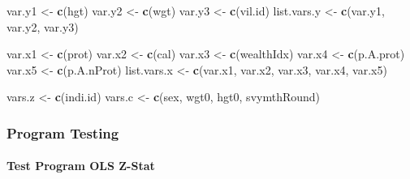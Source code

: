 \documentclass[
]{book}
\newenvironment{Shaded}{\begin{snugshade}}{\end{snugshade}}
\newcommand{\KeywordTok}[1]{\textcolor[rgb]{0.13,0.29,0.53}{\textbf{#1}}}
\newcommand{\NormalTok}[1]{#1}
\newcommand{\StringTok}[1]{\textcolor[rgb]{0.31,0.60,0.02}{#1}}
\begin{document}
\begin{Shaded}
\begin{Highlighting}[]
\NormalTok{var.y1 \textless{}{-}}\StringTok{ }\KeywordTok{c}\NormalTok{(}\StringTok{\textquotesingle{}hgt\textquotesingle{}}\NormalTok{)}
\NormalTok{var.y2 \textless{}{-}}\StringTok{ }\KeywordTok{c}\NormalTok{(}\StringTok{\textquotesingle{}wgt\textquotesingle{}}\NormalTok{)}
\NormalTok{var.y3 \textless{}{-}}\StringTok{ }\KeywordTok{c}\NormalTok{(}\StringTok{\textquotesingle{}vil.id\textquotesingle{}}\NormalTok{)}
\NormalTok{list.vars.y \textless{}{-}}\StringTok{ }\KeywordTok{c}\NormalTok{(var.y1, var.y2, var.y3)}

\NormalTok{var.x1 \textless{}{-}}\StringTok{ }\KeywordTok{c}\NormalTok{(}\StringTok{\textquotesingle{}prot\textquotesingle{}}\NormalTok{)}
\NormalTok{var.x2 \textless{}{-}}\StringTok{ }\KeywordTok{c}\NormalTok{(}\StringTok{\textquotesingle{}cal\textquotesingle{}}\NormalTok{)}
\NormalTok{var.x3 \textless{}{-}}\StringTok{ }\KeywordTok{c}\NormalTok{(}\StringTok{\textquotesingle{}wealthIdx\textquotesingle{}}\NormalTok{)}
\NormalTok{var.x4 \textless{}{-}}\StringTok{ }\KeywordTok{c}\NormalTok{(}\StringTok{\textquotesingle{}p.A.prot\textquotesingle{}}\NormalTok{)}
\NormalTok{var.x5 \textless{}{-}}\StringTok{ }\KeywordTok{c}\NormalTok{(}\StringTok{\textquotesingle{}p.A.nProt\textquotesingle{}}\NormalTok{)}
\NormalTok{list.vars.x \textless{}{-}}\StringTok{ }\KeywordTok{c}\NormalTok{(var.x1, var.x2, var.x3, var.x4, var.x5)}

\NormalTok{vars.z \textless{}{-}}\StringTok{ }\KeywordTok{c}\NormalTok{(}\StringTok{\textquotesingle{}indi.id\textquotesingle{}}\NormalTok{)}
\NormalTok{vars.c \textless{}{-}}\StringTok{ }\KeywordTok{c}\NormalTok{(}\StringTok{\textquotesingle{}sex\textquotesingle{}}\NormalTok{, }\StringTok{\textquotesingle{}wgt0\textquotesingle{}}\NormalTok{, }\StringTok{\textquotesingle{}hgt0\textquotesingle{}}\NormalTok{, }\StringTok{\textquotesingle{}svymthRound\textquotesingle{}}\NormalTok{)}
\end{Highlighting}
\end{Shaded}

\hypertarget{program-testing-1}{%
\subsubsection{Program Testing}\label{program-testing-1}}

\hypertarget{test-program-ols-z-stat}{%
\paragraph{Test Program OLS Z-Stat}\label{test-program-ols-z-stat}}
\end{document}
